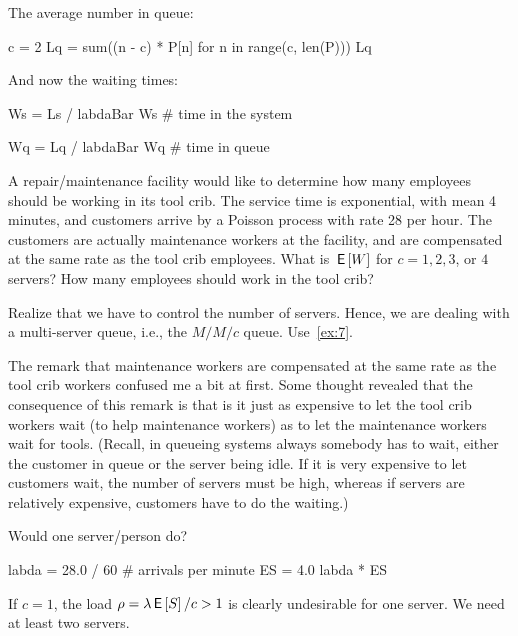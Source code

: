 \documentclass[companion]{subfiles}
\begin{document}
\begin{extra}[Hall 5.8]
\begin{solution}
The average number in queue: 
\begin{pyconsole}
c = 2
Lq = sum((n - c) * P[n] for n in range(c, len(P)))
Lq
\end{pyconsole} 

And now the waiting times:

\begin{pyconsole}
Ws = Ls / labdaBar
Ws  # time in the system

Wq = Lq / labdaBar
Wq  # time in queue
\end{pyconsole} 

\end{solution}
\end{extra}

\begin{exercise}[Hall 5.10] 
A repair/maintenance facility would like to determine how many employees should be working in its tool crib.
 The service time is exponential, with mean 4 minutes, and customers arrive by a Poisson process with rate 28 per hour.
 The customers are actually maintenance workers at the facility, and are compensated at the same rate as the tool crib employees.
 What is $\,\mathsf{E}\left[W\right]$ for $c=1, 2, 3$, or $4$ servers?
 How many employees should work in the tool crib?
\begin{hint}
 Realize that we have to control the number of servers.
 Hence, we are dealing with a multi-server queue, i.e., the $M/M/c$ queue.
 Use~\cref{ex:7}.

The remark that maintenance workers are compensated at the same rate
as the tool crib workers confused me a bit at first. Some thought
revealed that the consequence of this remark is that is it just as
expensive to let the tool crib workers wait (to help maintenance
workers) as to let the maintenance workers wait for tools. (Recall, in
queueing systems always somebody has to wait, either the customer in queue or
the server being idle. If it is very expensive to let customers wait, the number
of servers must be high, whereas if servers are relatively expensive, customers have to do the waiting.)
\end{hint}
\begin{solution}

 Would one server/person do? 
\begin{pyconsole}
labda = 28.0 / 60  # arrivals per minute
ES = 4.0
labda * ES
\end{pyconsole} 

If $c=1$, the load $\rho=\lambda \,\mathsf{E}\left[S\right]/c >1$ is clearly undesirable for one server. We need at
least two servers.


\end{solution}
\end{exercise}
\end{document}
